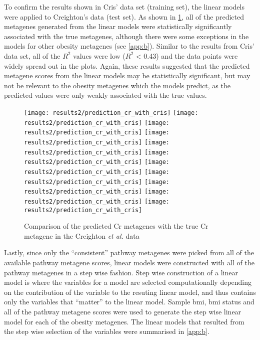 To confirm the results shown in Cris' data set (training set), the linear models were applied to Creighton's data (test set).
As shown in \cref{fig:predict_cr_cris}, all of the predicted metagenes generated from the linear models were statistically significantly associated with the true metagenes, although there were some exceptions in the models for other obesity metagenes (see \cref{app:b}).
Similar to the results from Cris' data set, all of the $R^2$ values were low ($R^2$ \textless{} 0.43) and the data points were widely spread out in the plots.
Again, these results suggested that the predicted metagene scores from the linear models may be statistically significant, but may not be relevant to the obesity metagenes which the models predict, as the predicted values were only weakly associated with the true values.
\\

\begin{figure}[htpb]
	\centering
	\texttt{[image: results2/prediction\_cr\_with\_cris]}
	\texttt{[image: results2/prediction\_cr\_with\_cris]}
	\texttt{[image: results2/prediction\_cr\_with\_cris]}
	\texttt{[image: results2/prediction\_cr\_with\_cris]}
	\texttt{[image: results2/prediction\_cr\_with\_cris]}
	\texttt{[image: results2/prediction\_cr\_with\_cris]}
	\texttt{[image: results2/prediction\_cr\_with\_cris]}
	\texttt{[image: results2/prediction\_cr\_with\_cris]}
	\texttt{[image: results2/prediction\_cr\_with\_cris]}
	\texttt{[image: results2/prediction\_cr\_with\_cris]}
	\texttt{[image: results2/prediction\_cr\_with\_cris]}
	\caption{Comparison of the predicted Cr metagenes with the true Cr metagene in the Creighton \textit{et al.} data}
	\label{fig:predict_cr_cris}
\end{figure}

\noindent
Lastly, since only the ``consistent'' pathway metagenes were picked from all of the available pathway metagene scores, linear models were constructed with all of the pathway metagenes in a step wise fashion.
Step wise construction of a linear model is where the variables for a model are selected computationally depending on the contribution of the variable to the resuting linear model, and thus contains only the variables that ``matter'' to the linear model.
Sample \gls{bmi}, \gls{bmi} status and all of the pathway metagene scores were used to generate the step wise linear model for each of the obesity metagenes.
The linear models that resulted from the step wise selection of the variables were summarised in \cref{app:b}.

